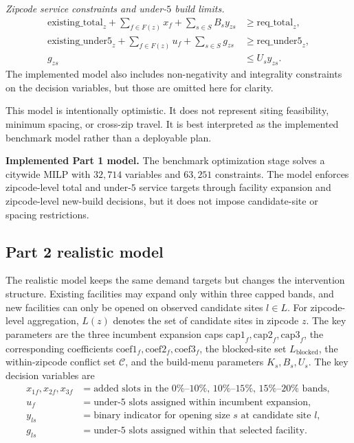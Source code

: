 \documentclass[11pt]{article}
\begin{document}
\noindent\textit{Zipcode service constraints and under-\(5\) build limits.}
\[
\begin{aligned}
\mathrm{existing\_total}_z + \sum_{f \in F(z)}x_f + \sum_{s \in S}B_s y_{zs}
&\ge \mathrm{req\_total}_z,\\
\mathrm{existing\_under5}_z + \sum_{f \in F(z)}u_f + \sum_{s \in S}g_{zs}
&\ge \mathrm{req\_under5}_z,\\
g_{zs} &\le U_s y_{zs}.
\end{aligned}
\] The implemented model also includes non-negativity and integrality constraints on the decision variables, but those are omitted here for clarity.

This model is intentionally optimistic. It does not represent siting feasibility, minimum spacing, or cross-zip travel. It is best interpreted as the implemented benchmark model rather than a deployable plan.

\begin{resultbox}
\textbf{Implemented Part 1 model.}
The benchmark optimization stage solves a citywide MILP with \(32{,}714\) variables and \(63{,}251\) constraints. The model enforces zipcode-level total and under-\(5\) service targets through facility expansion and zipcode-level new-build decisions, but it does not impose candidate-site or spacing restrictions.
\end{resultbox}

\subsection{Part 2 realistic model}

The realistic model keeps the same demand targets but changes the intervention structure. Existing facilities may expand only within three capped bands, and new facilities can only be opened on observed candidate sites \(l \in L\). For zipcode-level aggregation, \(L(z)\) denotes the set of candidate sites in zipcode \(z\). The key parameters are the three incumbent expansion caps \(\mathrm{cap1}_f,\mathrm{cap2}_f,\mathrm{cap3}_f\), the corresponding coefficients \(\mathrm{coef1}_f,\mathrm{coef2}_f,\mathrm{coef3}_f\), the blocked-site set \(L_{\text{blocked}}\), the within-zipcode conflict set \(\mathcal{C}\), and the build-menu parameters \(K_s,B_s,U_s\). The key decision variables are
\[
\begin{aligned}
x_{1f},x_{2f},x_{3f} &= \text{added slots in the }0\%\text{--}10\%,\,10\%\text{--}15\%,\,15\%\text{--}20\%\text{ bands},\\
u_f &= \text{under-\(5\) slots assigned within incumbent expansion},\\
y_{ls} &= \text{binary indicator for opening size } s \text{ at candidate site } l,\\
g_{ls} &= \text{under-\(5\) slots assigned within that selected facility.}
\end{aligned}
\]
\end{document}
